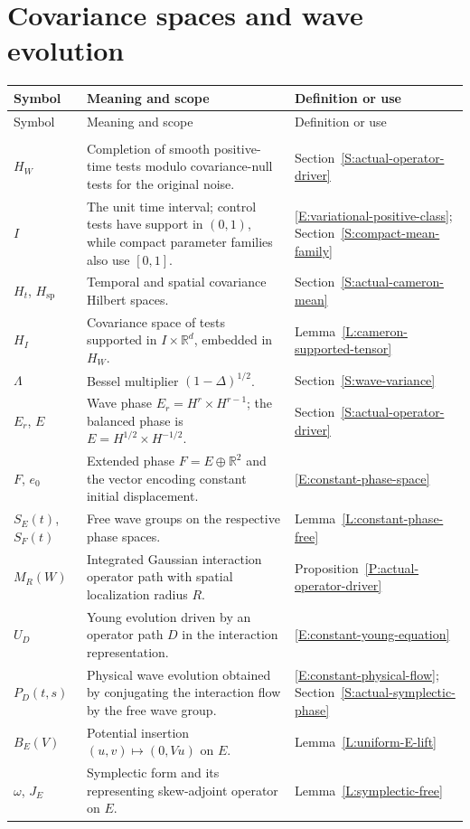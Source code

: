 \section*{Covariance spaces and wave evolution}
\begin{longtable}{@{}>{\raggedright\arraybackslash}p{}
  >{\raggedright\arraybackslash}p{}
  >{\raggedright\arraybackslash}p{}@{}}
  \toprule
  Symbol & Meaning and scope & Definition or use \\
  \midrule
  \endfirsthead
  \toprule
  Symbol & Meaning and scope & Definition or use \\
  \midrule
  \endhead
  \midrule
  \multicolumn{3}{r}{\emph{Continued on the next page}} \\
  \endfoot
  \bottomrule
  \endlastfoot
  $H_W$ &
  Completion of smooth positive-time tests modulo covariance-null tests for the
  original noise. &
  Section~\ref{S:actual-operator-driver} \\[5pt]
  $I$ &
  The unit time interval; control tests have support in $(0,1)$, while compact
  parameter families also use $[0,1]$. &
  \eqref{E:variational-positive-class}; Section~\ref{S:compact-mean-family}
  \\[5pt]
  $H_t$, $H_{\mathrm{sp}}$ &
  Temporal and spatial covariance Hilbert spaces. &
  Section~\ref{S:actual-cameron-mean} \\[5pt]
  $H_I$ &
  Covariance space of tests supported in $I \times \mathbb{R}^d$, embedded in
  $H_W$. &
  Lemma~\ref{L:cameron-supported-tensor} \\[5pt]
  $\Lambda$ &
  Bessel multiplier $(1-\Delta)^{1/2}$. &
  Section~\ref{S:wave-variance} \\[5pt]
  $E_r$, $E$ &
  Wave phase $E_r = H^r \times H^{r-1}$; the balanced phase is $E = H^{1/2}
  \times H^{-1/2}$. &
  Section~\ref{S:actual-operator-driver} \\[5pt]
  $F$, $e_0$ &
  Extended phase $F = E \oplus \mathbb{R}^2$ and the vector encoding constant
  initial displacement. &
  \eqref{E:constant-phase-space} \\[5pt]
  $S_E(t)$, $S_F(t)$ &
  Free wave groups on the respective phase spaces. &
  Lemma~\ref{L:constant-phase-free} \\[5pt]
  $M_R(W)$ &
  Integrated Gaussian interaction operator path with spatial localization radius
  $R$. &
  Proposition~\ref{P:actual-operator-driver} \\[5pt]
  $U_D$ &
  Young evolution driven by an operator path $D$ in the interaction
  representation. &
  \eqref{E:constant-young-equation} \\[5pt]
  $P_D(t,s)$ &
  Physical wave evolution obtained by conjugating the interaction flow by the
  free wave group. &
  \eqref{E:constant-physical-flow}; Section~\ref{S:actual-symplectic-phase}
  \\[5pt]
  $B_E(V)$ &
  Potential insertion $(u,v) \mapsto (0,Vu)$ on $E$. &
  Lemma~\ref{L:uniform-E-lift} \\[5pt]
  $\omega$, $J_E$ &
  Symplectic form and its representing skew-adjoint operator on $E$. &
  Lemma~\ref{L:symplectic-free} \\[5pt]
\end{longtable}

